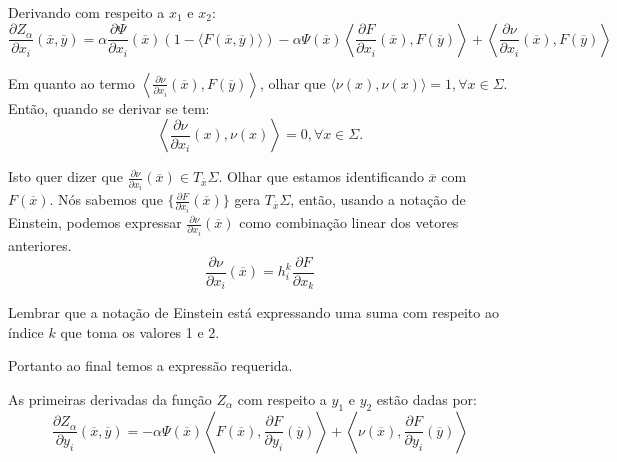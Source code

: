\begin{demonstracao}
	Derivando com respeito a $x_1$ e $x_2$:
	\begin{equation*}
		\frac{\partial Z_{\alpha}}{\partial x_i} (\overline{x}, \overline{y}) = \alpha \frac{\partial \Psi}{\partial x_i}(\overline{x}) (1 - \langle F(\overline{x}, \overline{y}) \rangle) - \alpha \Psi(\overline{x}) \left\langle \frac{\partial F}{\partial x_i}(\overline{x}), F(\overline{y}) \right\rangle + \left\langle \frac{\partial \nu}{\partial x_i}(\overline{x}), F(\overline{y}) \right\rangle
	\end{equation*}
	
	Em quanto ao termo $ \left\langle \frac{\partial \nu}{\partial x_i}(\overline{x}), F(\overline{y}) \right\rangle $, olhar que $\langle \nu(x), \nu(x) \rangle=1, \forall x \in \Sigma$. Então, quando se derivar se tem:
	\begin{equation*}
		\left\langle \frac{\partial \nu}{\partial x_i}(x), \nu(x) \right\rangle = 0, \forall x \in \Sigma.
	\end{equation*}
	
	Isto quer dizer que $\frac{\partial \nu}{\partial x_i}(\overline{x}) \in T_{\overline{x}} \Sigma$. Olhar que estamos identificando $\overline{x}$ com $F(\overline{x})$. Nós sabemos que $\{ \frac{\partial F}{\partial x_i}(\overline{x}) \}$ gera $T_{\overline{x}} \Sigma$, então, usando a notação de Einstein, podemos expressar $\frac{\partial \nu}{\partial x_i}(\overline{x})$ como combinação linear dos vetores anteriores.
	\begin{equation*}
		\frac{\partial \nu}{\partial x_i} (\overline{x}) = h_i^k \frac{\partial F}{\partial x_k}
	\end{equation*}
	
	Lembrar que a notação de Einstein está expressando uma suma com respeito ao índice $k$ que toma os valores 1 e 2.
	
	Portanto ao final temos a expressão requerida.
\end{demonstracao}

\begin{proposicao}
	As primeiras derivadas da função $Z_{\alpha}$ com respeito a $y_1$ e $y_2$ estão dadas por:
	\begin{equation*}
		\frac{\partial Z_{\alpha}}{\partial y_i} (\overline{x}, \overline{y}) = -\alpha \Psi(\overline{x}) \left\langle F(\overline{x}), \frac{\partial F}{\partial y_i} (\overline{y}) \right\rangle + \left\langle \nu(\overline{x}), \frac{\partial F}{\partial y_i}(\overline{y}) \right\rangle
	\end{equation*}
\end{proposicao}

